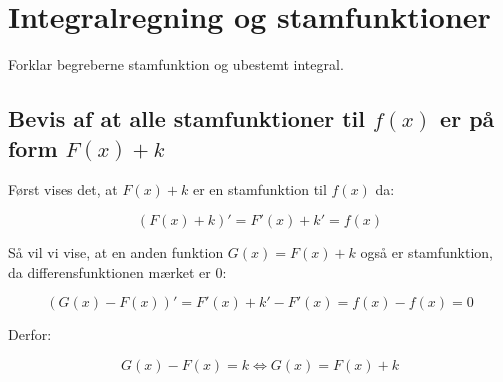 
\section{Integralregning og stamfunktioner}

Forklar begreberne stamfunktion og ubestemt integral.

\subsection{Bevis af at alle stamfunktioner til $f(x)$ er på form $F(x)+k$}

\begin{proofw}
    Først vises det, at $F(x)+k$ er en stamfunktion til $f(x)$ da:

    $$
        (F(x)+k)'=F'(x)+k'=f(x)
    $$

    Så vil vi vise, at en anden funktion $G(x)=F(x)+k$ også er stamfunktion,
    da differensfunktionen mærket er 0:

    $$
        (G(x)-F(x))'=F'(x)+k'-F'(x)=f(x)-f(x)=0
    $$

    Derfor:

    $$
        G(x)-F(x)=k \Leftrightarrow G(x)=F(x)+k
    $$

\end{proofw}
